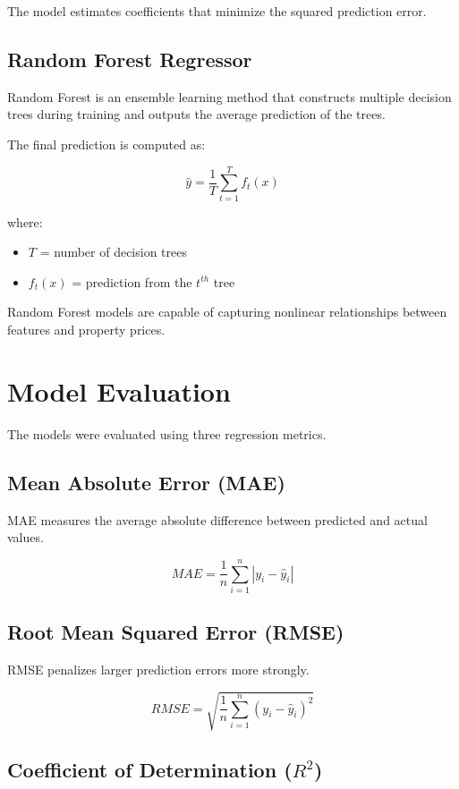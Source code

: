 \documentclass[12pt]{article}
\begin{document}
The model estimates coefficients that minimize the squared prediction error.

\subsection{Random Forest Regressor}

Random Forest is an ensemble learning method that constructs multiple decision trees during training and outputs the average prediction of the trees.

The final prediction is computed as:

\[
\hat{y} = \frac{1}{T}\sum_{t=1}^{T} f_t(x)
\]

where:

\begin{itemize}
\item $T$ = number of decision trees
\item $f_t(x)$ = prediction from the $t^{th}$ tree
\end{itemize}

Random Forest models are capable of capturing nonlinear relationships between features and property prices.

\section{Model Evaluation}

The models were evaluated using three regression metrics.

\subsection{Mean Absolute Error (MAE)}

MAE measures the average absolute difference between predicted and actual values.

\[
MAE = \frac{1}{n}\sum_{i=1}^{n} |y_i - \hat{y}_i|
\]

\subsection{Root Mean Squared Error (RMSE)}

RMSE penalizes larger prediction errors more strongly.

\[
RMSE = \sqrt{\frac{1}{n}\sum_{i=1}^{n}(y_i - \hat{y}_i)^2}
\]

\subsection{Coefficient of Determination ($R^2$)}
\end{document}
